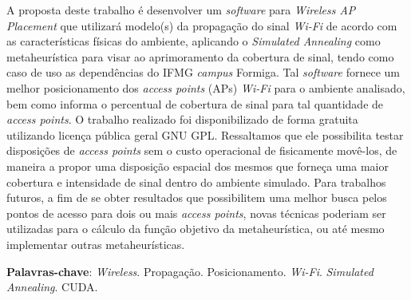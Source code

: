 \documentclass[
	12pt,				%
	twoside,			%
	a4paper,			%
	english,			%
	french,				%
	spanish,			%
	brazil				%
	]{abntex2}
\begin{document}
\setlength{\absparsep}{18pt} %
\begin{resumo}

  A proposta deste trabalho é desenvolver um \emph{software} para
  \emph{Wireless AP Placement} que utilizará modelo(s) da propagação do
  sinal \emph{Wi-Fi} de acordo com as características físicas do ambiente,
  aplicando o \emph{Simulated Annealing} como metaheurística para visar ao
  aprimoramento da cobertura de sinal, tendo como caso de uso as
  dependências do IFMG \emph{campus} Formiga. Tal \emph{software} fornece
  um melhor posicionamento dos \emph{access points} (APs) \emph{Wi-Fi}
  para o ambiente analisado, bem como informa o percentual de cobertura de
  sinal para tal quantidade de \emph{access points}. O trabalho realizado
  foi disponibilizado de forma gratuita utilizando licença pública geral
  GNU GPL. Ressaltamos que ele possibilita testar disposições de
  \emph{access points} sem o custo operacional de fisicamente movê-los, de
  maneira a propor uma disposição espacial dos mesmos que forneça uma
  maior cobertura e intensidade de sinal dentro do ambiente simulado. Para
  trabalhos futuros, a fim de se obter resultados que possibilitem uma
  melhor busca pelos pontos de acesso para dois ou mais \emph{access
  points}, novas técnicas poderiam ser utilizadas para o cálculo da função
  objetivo da metaheurística, ou até mesmo implementar outras
  metaheurísticas.

 \textbf{Palavras-chave}: \emph{Wireless}. Propagação. Posicionamento. \emph{Wi-Fi}.
\emph{Simulated Annealing}. CUDA.
\end{resumo}


\end{document}

